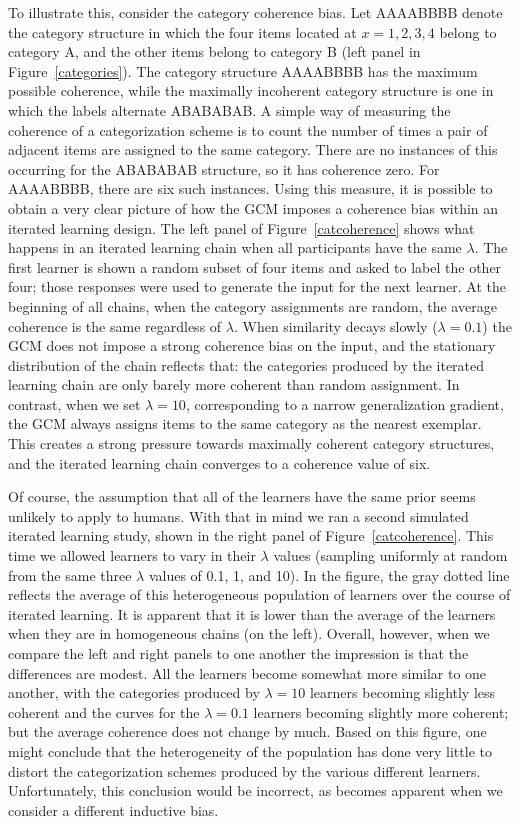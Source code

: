 \documentclass[doc]{apa6}
\begin{document}
To illustrate this, consider the category coherence bias. Let AAAABBBB denote the category structure in which the four items located at $x=1,2,3,4$ belong to category A, and the other items belong to category B (left panel in Figure~\ref{categories}). The category structure AAAABBBB has the maximum possible coherence, while the maximally incoherent category structure is one in which the labels alternate ABABABAB. A simple way of measuring the coherence of a categorization scheme is to count the number of times a pair of adjacent items are assigned to the same category. There are no instances of this occurring for the ABABABAB structure, so it has coherence zero. For AAAABBBB, there are six such instances. Using this measure, it is possible to obtain a very clear picture of how the GCM imposes a coherence bias within an iterated learning design. The left panel of Figure~\ref{catcoherence} shows what happens in an iterated learning chain when all participants have the same $\lambda$. The first learner is shown a random subset of four items and asked to label the other four; those responses were used to generate the input for the next learner. At the beginning of all chains, when the category assignments are random, the average coherence is the same regardless of $\lambda$. When similarity decays slowly ($\lambda=0.1$) the GCM does not impose a strong coherence bias on the input, and the stationary distribution of the chain reflects that: the categories produced by the iterated learning chain are only barely more coherent than random assignment. In contrast, when we set $\lambda=10$, corresponding to a narrow generalization gradient, the GCM always assigns items to the same category as the nearest exemplar. This creates a strong pressure towards maximally coherent category structures, and the iterated learning chain converges to a coherence value of six.

Of course, the assumption that all of the learners have the same prior seems unlikely to apply to humans. With that in mind we ran a second simulated iterated learning study, shown in the right panel of Figure~\ref{catcoherence}. This time we allowed learners to vary in their $\lambda$ values (sampling uniformly at random from the same three $\lambda$ values of 0.1, 1,  and 10). In the figure, the gray dotted line reflects the  average of this heterogeneous population of learners over the course of iterated learning. It is apparent that it is lower than the average of the learners when they are in homogeneous chains (on the left). Overall, however, when we compare the left and right panels to one another the impression is that the differences are modest. All the learners become somewhat more similar to one another, with the categories produced by $\lambda=10$ learners becoming slightly less coherent and the curves for the $\lambda=0.1$ learners becoming slightly more coherent; but the average coherence does not change by much. Based on this figure, one might conclude that the heterogeneity of the population has done very little to distort the categorization schemes produced by the various different learners. Unfortunately, this conclusion would be incorrect, as becomes apparent when we consider a different inductive bias.
\end{document}
